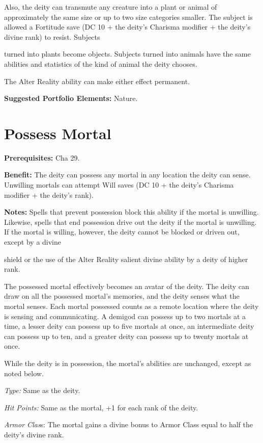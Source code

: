\documentclass{article}
\begin{document}
Also, the deity can transmute any creature into a plant or animal of approximately 
the same size or up to two size categories smaller. The subject is allowed a Fortitude 
save (DC 10 + the deity's Charisma modifier + the deity's divine rank) to resist. 
Subjects

turned into plants become objects. Subjects turned into animals have the same abilities 
and statistics of the kind of animal the deity chooses.

The Alter Reality ability can make either effect permanent.

\textbf{Suggested Portfolio Elements:} Nature.

\vspace{12pt}
\section*{Possess Mortal}

\textbf{Prerequisites:} Cha 29.

\textbf{Benefit:} The deity can possess any mortal in any location the deity can 
sense. Unwilling mortals can attempt Will saves (DC 10 + the deity's Charisma modifier 
+ the deity's rank).

\textbf{Notes:} Spells that prevent possession block this ability if the mortal 
is unwilling. Likewise, spells that end possession drive out the deity if the mortal 
is unwilling. If the mortal is willing, however, the deity cannot be blocked or 
driven out, except by a divine

shield or the use of the Alter Reality salient divine ability by a deity of higher 
rank.

The possessed mortal effectively becomes an avatar of the deity. The deity can 
draw on all the possessed mortal's memories, and the deity senses what the mortal 
senses. Each mortal possessed counts as a remote location where the deity is sensing 
and communicating. A demigod can possess up to two mortals at a time, a lesser 
deity can possess up to five mortals at once, an intermediate deity can possess 
up to ten, and a greater deity can possess up to twenty mortals at once.

While the deity is in possession, the mortal's abilities are unchanged, except 
as noted below.

\textit{Type: }Same as the deity.

\textit{Hit Points: }Same as the mortal, +1 for each rank of the deity.

\textit{Armor Clas}s: The mortal gains a divine bonus to Armor Class equal to half 
the deity's divine rank.
\end{document}
